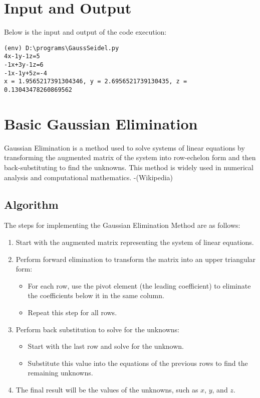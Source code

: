 \documentclass[12pt]{article}
\begin{document}
    \section*{Input and Output}
    \noindent Below is the input and output of the code execution:
                
    {\small
    \begin{verbatim}
(env) D:\programs\GaussSeidel.py
4x-1y-1z=5
-1x+3y-1z=6
-1x-1y+5z=-4
x = 1.9565217391304346, y = 2.6956521739130435, z = 0.13043478260869562
\end{verbatim}
    }

    \newpage
    \section*{Basic Gaussian Elimination}

    Gaussian Elimination is a method used to solve systems of linear equations by transforming the augmented matrix of the system into row-echelon form and then back-substituting to find the unknowns. This method is widely used in numerical analysis and computational mathematics. -(Wikipedia)

    \subsection*{Algorithm}
    The steps for implementing the Gaussian Elimination Method are as follows:

    \begin{enumerate}
        \item Start with the augmented matrix representing the system of linear equations.
        \item Perform forward elimination to transform the matrix into an upper triangular form:
        \begin{itemize}
            \item For each row, use the pivot element (the leading coefficient) to eliminate the coefficients below it in the same column.
            \item Repeat this step for all rows.
        \end{itemize}
        \item Perform back substitution to solve for the unknowns:
        \begin{itemize}
            \item Start with the last row and solve for the unknown.
            \item Substitute this value into the equations of the previous rows to find the remaining unknowns.
        \end{itemize}
        \item The final result will be the values of the unknowns, such as \( x \), \( y \), and \( z \).
    \end{enumerate}
\end{document}
